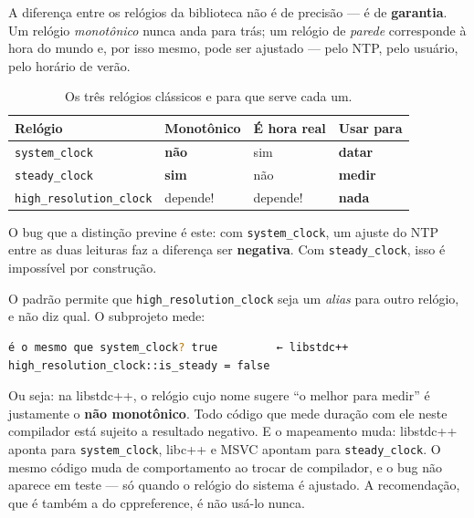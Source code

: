 A diferença entre os relógios da biblioteca não é de precisão --- é de
\textbf{garantia}. Um relógio \emph{monotônico} nunca anda para trás; um relógio
de \emph{parede} corresponde à hora do mundo e, por isso mesmo, pode ser
ajustado --- pelo NTP, pelo usuário, pelo horário de verão.

\begin{table}[htbp]
\centering
\caption{Os três relógios clássicos e para que serve cada um.}
\label{tab:relogios}
\footnotesize
\begin{tabular}{@{}llll@{}}
\toprule
\textbf{Relógio} & \textbf{Monotônico} & \textbf{É hora real} & \textbf{Usar para} \\
\midrule
\texttt{system\_clock}          & \textbf{não}    & sim     & \textbf{datar} \\
\texttt{steady\_clock}          & \textbf{sim}    & não     & \textbf{medir} \\
\texttt{high\_resolution\_clock}& depende!        & depende!& \textbf{nada} \\
\bottomrule
\end{tabular}
\end{table}

O bug que a distinção previne é este: com \texttt{system\_clock}, um ajuste do
NTP entre as duas leituras faz a diferença ser \textbf{negativa}. Com
\texttt{steady\_clock}, isso é impossível por construção.

\begin{armadilha}
O padrão permite que \texttt{high\_resolution\_clock} seja um \emph{alias} para
outro relógio, e não diz qual. O subprojeto mede:
\begin{lstlisting}[style=bt, language=bash, frame=none,
                   xleftmargin=0pt, xrightmargin=0pt]
é o mesmo que system_clock? true         ← libstdc++
high_resolution_clock::is_steady = false
\end{lstlisting}
Ou seja: na libstdc++, o relógio cujo nome sugere ``o melhor para medir'' é
justamente o \textbf{não monotônico}. Todo código que mede duração com ele neste
compilador está sujeito a resultado negativo. E o mapeamento muda: libstdc++
aponta para \texttt{system\_clock}, libc++ e MSVC apontam para
\texttt{steady\_clock}. O mesmo código muda de comportamento ao trocar de
compilador, e o bug não aparece em teste --- só quando o relógio do sistema é
ajustado. A recomendação, que é também a do cppreference, é não usá-lo nunca.
\end{armadilha}

